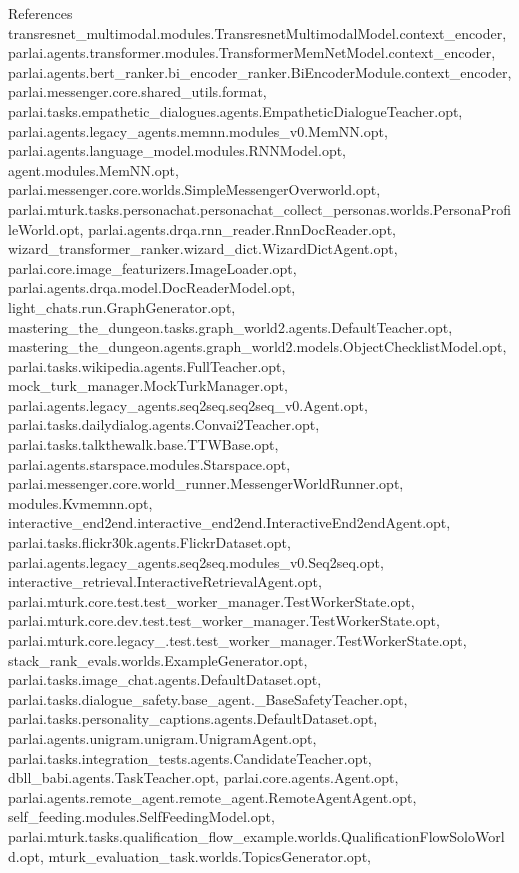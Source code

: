 References transresnet\+\_\+multimodal.\+modules.\+Transresnet\+Multimodal\+Model.\+context\+\_\+encoder, parlai.\+agents.\+transformer.\+modules.\+Transformer\+Mem\+Net\+Model.\+context\+\_\+encoder, parlai.\+agents.\+bert\+\_\+ranker.\+bi\+\_\+encoder\+\_\+ranker.\+Bi\+Encoder\+Module.\+context\+\_\+encoder, parlai.\+messenger.\+core.\+shared\+\_\+utils.\+format, parlai.\+tasks.\+empathetic\+\_\+dialogues.\+agents.\+Empathetic\+Dialogue\+Teacher.\+opt, parlai.\+agents.\+legacy\+\_\+agents.\+memnn.\+modules\+\_\+v0.\+Mem\+N\+N.\+opt, parlai.\+agents.\+language\+\_\+model.\+modules.\+R\+N\+N\+Model.\+opt, agent.\+modules.\+Mem\+N\+N.\+opt, parlai.\+messenger.\+core.\+worlds.\+Simple\+Messenger\+Overworld.\+opt, parlai.\+mturk.\+tasks.\+personachat.\+personachat\+\_\+collect\+\_\+personas.\+worlds.\+Persona\+Profile\+World.\+opt, parlai.\+agents.\+drqa.\+rnn\+\_\+reader.\+Rnn\+Doc\+Reader.\+opt, wizard\+\_\+transformer\+\_\+ranker.\+wizard\+\_\+dict.\+Wizard\+Dict\+Agent.\+opt, parlai.\+core.\+image\+\_\+featurizers.\+Image\+Loader.\+opt, parlai.\+agents.\+drqa.\+model.\+Doc\+Reader\+Model.\+opt, light\+\_\+chats.\+run.\+Graph\+Generator.\+opt, mastering\+\_\+the\+\_\+dungeon.\+tasks.\+graph\+\_\+world2.\+agents.\+Default\+Teacher.\+opt, mastering\+\_\+the\+\_\+dungeon.\+agents.\+graph\+\_\+world2.\+models.\+Object\+Checklist\+Model.\+opt, parlai.\+tasks.\+wikipedia.\+agents.\+Full\+Teacher.\+opt, mock\+\_\+turk\+\_\+manager.\+Mock\+Turk\+Manager.\+opt, parlai.\+agents.\+legacy\+\_\+agents.\+seq2seq.\+seq2seq\+\_\+v0.\+Agent.\+opt, parlai.\+tasks.\+dailydialog.\+agents.\+Convai2\+Teacher.\+opt, parlai.\+tasks.\+talkthewalk.\+base.\+T\+T\+W\+Base.\+opt, parlai.\+agents.\+starspace.\+modules.\+Starspace.\+opt, parlai.\+messenger.\+core.\+world\+\_\+runner.\+Messenger\+World\+Runner.\+opt, modules.\+Kvmemnn.\+opt, interactive\+\_\+end2end.\+interactive\+\_\+end2end.\+Interactive\+End2end\+Agent.\+opt, parlai.\+tasks.\+flickr30k.\+agents.\+Flickr\+Dataset.\+opt, parlai.\+agents.\+legacy\+\_\+agents.\+seq2seq.\+modules\+\_\+v0.\+Seq2seq.\+opt, interactive\+\_\+retrieval.\+Interactive\+Retrieval\+Agent.\+opt, parlai.\+mturk.\+core.\+test.\+test\+\_\+worker\+\_\+manager.\+Test\+Worker\+State.\+opt, parlai.\+mturk.\+core.\+dev.\+test.\+test\+\_\+worker\+\_\+manager.\+Test\+Worker\+State.\+opt, parlai.\+mturk.\+core.\+legacy\+\_.\+test.\+test\+\_\+worker\+\_\+manager.\+Test\+Worker\+State.\+opt, stack\+\_\+rank\+\_\+evals.\+worlds.\+Example\+Generator.\+opt, parlai.\+tasks.\+image\+\_\+chat.\+agents.\+Default\+Dataset.\+opt, parlai.\+tasks.\+dialogue\+\_\+safety.\+base\+\_\+agent.\+\_\+\+Base\+Safety\+Teacher.\+opt, parlai.\+tasks.\+personality\+\_\+captions.\+agents.\+Default\+Dataset.\+opt, parlai.\+agents.\+unigram.\+unigram.\+Unigram\+Agent.\+opt, parlai.\+tasks.\+integration\+\_\+tests.\+agents.\+Candidate\+Teacher.\+opt, dbll\+\_\+babi.\+agents.\+Task\+Teacher.\+opt, parlai.\+core.\+agents.\+Agent.\+opt, parlai.\+agents.\+remote\+\_\+agent.\+remote\+\_\+agent.\+Remote\+Agent\+Agent.\+opt, self\+\_\+feeding.\+modules.\+Self\+Feeding\+Model.\+opt, parlai.\+mturk.\+tasks.\+qualification\+\_\+flow\+\_\+example.\+worlds.\+Qualification\+Flow\+Solo\+World.\+opt, mturk\+\_\+evaluation\+\_\+task.\+worlds.\+Topics\+Generator.\+opt, 